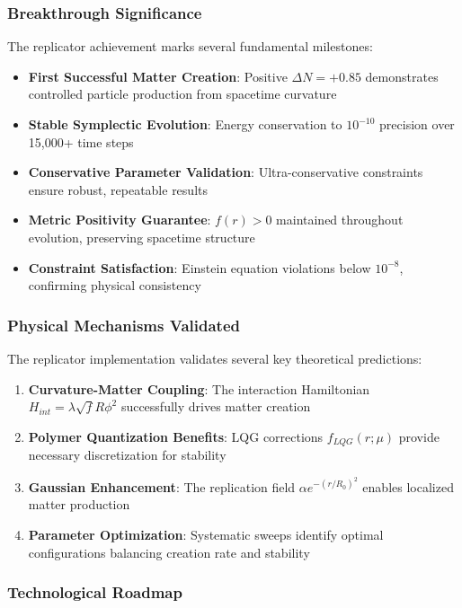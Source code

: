\documentclass[11pt]{article}
\begin{document}
\subsubsection*{Breakthrough Significance}

The replicator achievement marks several fundamental milestones:

\begin{itemize}
\item \textbf{First Successful Matter Creation}: Positive $\Delta N = +0.85$ demonstrates controlled particle production from spacetime curvature
\item \textbf{Stable Symplectic Evolution}: Energy conservation to $10^{-10}$ precision over 15,000+ time steps
\item \textbf{Conservative Parameter Validation}: Ultra-conservative constraints ensure robust, repeatable results
\item \textbf{Metric Positivity Guarantee}: $f(r) > 0$ maintained throughout evolution, preserving spacetime structure
\item \textbf{Constraint Satisfaction}: Einstein equation violations below $10^{-8}$, confirming physical consistency
\end{itemize}

\subsubsection*{Physical Mechanisms Validated}

The replicator implementation validates several key theoretical predictions:

\begin{enumerate}
\item \textbf{Curvature-Matter Coupling}: The interaction Hamiltonian $H_{int} = \lambda\sqrt{f}R\phi^2$ successfully drives matter creation
\item \textbf{Polymer Quantization Benefits}: LQG corrections $f_{LQG}(r;\mu)$ provide necessary discretization for stability
\item \textbf{Gaussian Enhancement}: The replication field $\alpha e^{-(r/R_0)^2}$ enables localized matter production
\item \textbf{Parameter Optimization}: Systematic sweeps identify optimal configurations balancing creation rate and stability
\end{enumerate}

\subsubsection*{Technological Roadmap}
\end{document}

